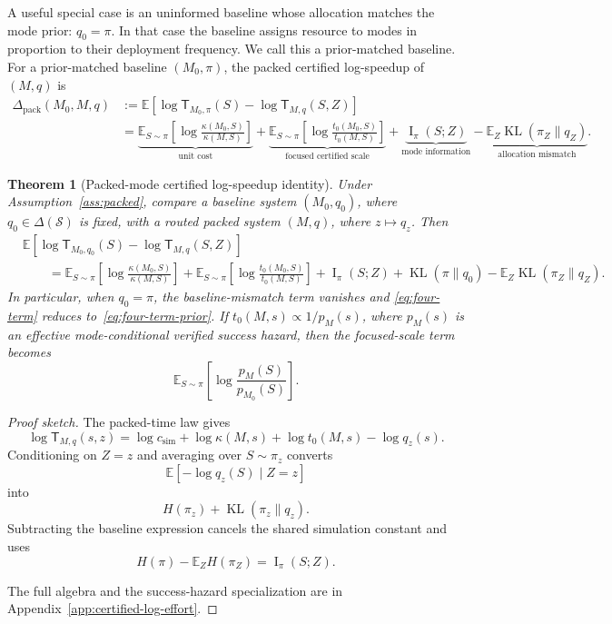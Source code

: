 \documentclass{article}
\newtheorem{theorem}{Theorem}
\DeclareMathOperator{\KL}{KL}
\DeclareMathOperator{\MI}{I}
\newcommand{\cS}{\mathcal{S}}
\newcommand{\E}{\mathbb{E}}
\begin{document}
A useful special case is an uninformed baseline whose allocation matches the mode prior:
\(q_0=\pi\).  In that case the baseline assigns resource to modes in proportion to their
deployment frequency.  We call this a prior-matched baseline.
For a prior-matched baseline \((M_0,\pi)\), the packed certified log-speedup of
\((M,q)\) is
\begin{equation}
\label{eq:four-term-prior}
\begin{aligned}
    \Delta_{\mathrm{pack}}(M_0,M,q)
    &:=
    \E\!\left[
        \log \mathsf T_{M_0,\pi}(S)
        -
        \log \mathsf T_{M,q}(S,Z)
    \right]
    \\
    &=
    \underbrace{
    \E_{S\sim\pi}
    \left[
        \log\frac{\kappa(M_0,S)}{\kappa(M,S)}
    \right]
    }_{\text{unit cost}}
    +
    \underbrace{
    \E_{S\sim\pi}
    \left[
        \log\frac{t_0(M_0,S)}{t_0(M,S)}
    \right]
    }_{\text{focused certified scale}}
    +
    \underbrace{\MI_\pi(S;Z)}_{\text{mode information}}
    -
    \underbrace{\E_Z\KL(\pi_Z\|q_Z)}_{\text{allocation mismatch}} .
\end{aligned}
\end{equation}

\begin{theorem}[Packed-mode certified log-speedup identity]
\label{thm:four-term}
Under Assumption~\ref{ass:packed}, compare a baseline system \((M_0,q_0)\), where
\(q_0\in\Delta(\cS)\) is fixed, with a routed packed system \((M,q)\), where
\(z\mapsto q_z\).  Then
\begin{equation}
\label{eq:four-term}
\begin{aligned}
&\E\!\left[
    \log \mathsf T_{M_0,q_0}(S)
    -
    \log \mathsf T_{M,q}(S,Z)
\right]
\\
&\qquad =
\E_{S\sim\pi}
\left[
    \log\frac{\kappa(M_0,S)}{\kappa(M,S)}
\right]
+
\E_{S\sim\pi}
\left[
    \log\frac{t_0(M_0,S)}{t_0(M,S)}
\right]
+
\MI_\pi(S;Z)
+
\KL(\pi\|q_0)
-
\E_Z\KL(\pi_Z\|q_Z).
\end{aligned}
\end{equation}
In particular, when \(q_0=\pi\), the baseline-mismatch term vanishes and
\eqref{eq:four-term} reduces to~\eqref{eq:four-term-prior}.
If \(t_0(M,s)\propto 1/p_M(s)\), where \(p_M(s)\) is an effective mode-conditional
verified success hazard, then the focused-scale term becomes
\[
    \E_{S\sim\pi}
    \left[
        \log\frac{p_M(S)}{p_{M_0}(S)}
    \right].
\]
\end{theorem}

\begin{proof}[Proof sketch]
The packed-time law gives
\[
    \log \mathsf T_{M,q}(s,z)
    =
    \log c_{\mathrm{sim}}
    +
    \log\kappa(M,s)
    +
    \log t_0(M,s)
    -
    \log q_z(s).
\]
Conditioning on \(Z=z\) and averaging over \(S\sim\pi_z\) converts
\[
    \E[-\log q_z(S)\mid Z=z]
\]
into
\[
    H(\pi_z)+\KL(\pi_z\|q_z).
\]
Subtracting the baseline expression cancels the shared simulation constant and uses
\[
    H(\pi)-\E_ZH(\pi_Z)=\MI_\pi(S;Z).
\]


The full algebra and the success-hazard specialization are in
Appendix~\ref{app:certified-log-effort}.
\end{proof}
\end{document}
